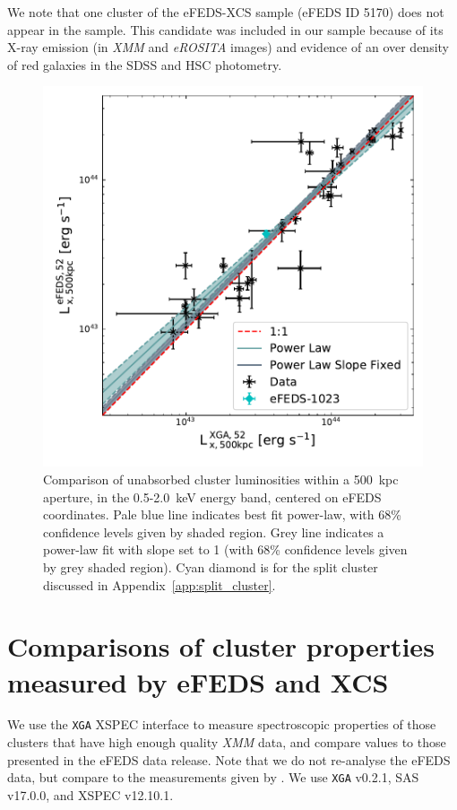 \documentclass[fleqn,usenatbib]{mnras}
\begin{document}
We note that one cluster of the eFEDS-XCS sample (eFEDS ID 5170) does not appear in the \cite{efedsclusteropticalcat} sample. This candidate was included in our sample because of its X-ray emission (in {\em XMM} and {\em eROSITA} images) and evidence of an over density of red galaxies in the SDSS and HSC photometry.

\begin{figure}
    \centering
    \includegraphics[width=0.95\columnwidth]{images/efeds_xcs_l500cal.pdf}
    \caption[]{Comparison of unabsorbed cluster luminosities within a 500~kpc aperture, in the 0.5-2.0~keV energy band, centered on eFEDS coordinates. Pale blue line indicates best fit power-law, with 68\% confidence levels given by shaded region. Grey line indicates a power-law fit with slope set to 1 (with 68\% confidence levels given by grey shaded region). Cyan diamond is for the split cluster discussed in Appendix~\ref{app:split_cluster}.}
    \label{fig:l500kpccomp}
\end{figure}

\section{Comparisons of cluster properties measured by \lowercase{e}FEDS and XCS}
\label{sec:meascomp}

We use the \texttt{XGA} \citep[][]{xgapaper} XSPEC \citep[][]{xspec} interface to measure spectroscopic properties of those clusters that have high enough quality {\em XMM} data, and compare values to those presented in the eFEDS data release. Note that we do not re-analyse the eFEDS data, but compare to the measurements given by \cite{efedsclustercat}. We use \texttt{XGA} v0.2.1, SAS v17.0.0, and XSPEC v12.10.1.
\end{document}
